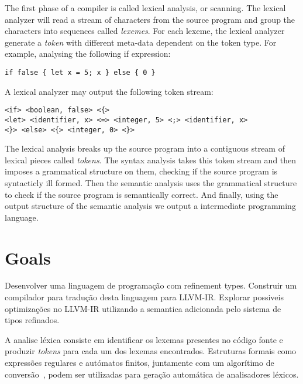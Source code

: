 \documentclass[
  english,
  lmodern,
  oneside
]{ufsc-thesis-rn46-2019/ufsc-thesis-rn46-2019}
\begin{document}
The first phase of a compiler is called lexical analysis, or scanning.
The lexical analyzer will read a stream of characters from the source program and group the characters into sequences called \textit{lexemes}.
For each lexeme, the lexical analyzer generate a \textit{token} with different meta-data dependent on the token type.
For example, analysing the following if expression:
\begin{center}
\begin{varwidth}{\linewidth}
\begin{verbatim}
if false { let x = 5; x } else { 0 }
\end{verbatim}
\end{varwidth}
\end{center}
A lexical analyzer may output the following token stream:
\begin{center}
\begin{varwidth}{\linewidth}
\begin{verbatim}
<if> <boolean, false> <{>
<let> <identifier, x> <=> <integer, 5> <;> <identifier, x>
<}> <else> <{> <integer, 0> <}>
\end{verbatim}
\end{varwidth}
\end{center}




The lexical analysis breaks up the source program into a contiguous stream of lexical pieces called \textit{tokens}.
The syntax analysis takes this token stream and then imposes a grammatical structure on them, checking if the source program is syntacticly ill formed.
Then the semantic analysis uses the grammatical structure to check if the source program is semantically correct.
And finally, using the output structure of the semantic analysis we output a intermediate programming language.



\section{Goals}\label{cap:introduction:sec:goals}

Desenvolver uma linguagem de programação com refinement types.
Construir um compilador para tradução desta linguagem para LLVM-IR.\@
Explorar possiveis optimizações no LLVM-IR utilizando a semantica adicionada pelo sistema de tipos refinados.



A analise léxica consiste em identificar os lexemas presentes no código fonte e produzir \textit{tokens} para cada um dos lexemas encontrados.
Estruturas formais como expressões regulares e autómatos finitos, juntamente com um algorítimo de conversão~\cite{lesk1975lex}, podem ser utilizadas para geração automática de analisadores léxicos.
\end{document}
